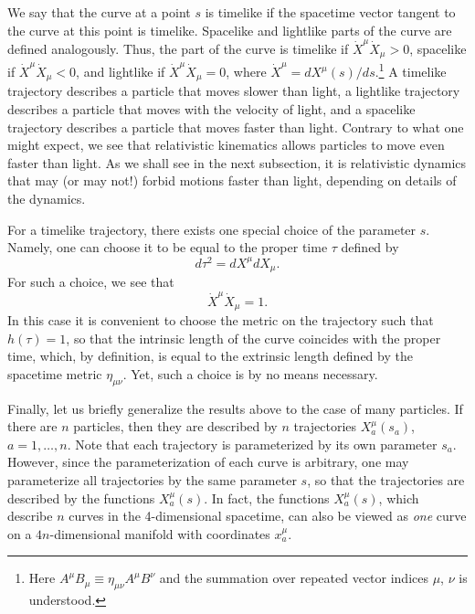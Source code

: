 \documentclass[12pt,twoside]{report} %
\begin{document}
We say that the curve at a point $s$ is timelike if the spacetime vector tangent to the curve at this
point is timelike. Spacelike and lightlike parts of the curve are defined analogously.
Thus, the part of the curve is timelike if $\dot{X}^{\mu} \dot{X}_{\mu}>0$,
spacelike if $\dot{X}^{\mu} \dot{X}_{\mu}<0$, and lightlike if $\dot{X}^{\mu} \dot{X}_{\mu}=0$, where $\dot{X}^{\mu}=dX^{\mu}(s)/ds$.\footnote{Here $A^{\mu} B_{\mu}\equiv \eta_{\mu\nu}A^{\mu} B^{\nu}$ and the summation
over repeated vector indices $\mu$, $\nu$ is understood.}
A timelike trajectory describes a particle that moves slower than light, a lightlike trajectory
describes a particle that moves with the velocity of light, and a spacelike
trajectory describes a particle that moves faster than light.
Contrary to what one might expect, we see that relativistic kinematics allows
particles to move even faster than light. As we shall see in the next subsection,
it is relativistic dynamics that may (or may not!) forbid motions faster than light,
depending on details of the dynamics.

For a timelike trajectory, there exists one special choice of the parameter $s$.
Namely, one can choose it to be equal to the proper time $\tau$ defined by
\begin{equation}\label{nikolic:book4}
 d\tau^2=dX^{\mu}dX_{\mu} .
\end{equation}
For such a choice, we see that
\begin{equation}\label{nikolic:book5}
\dot{X}^{\mu} \dot{X}_{\mu}=1 .
\end{equation}
In this case it is convenient to choose the metric on the trajectory such that
$h(\tau)=1$, so that the intrinsic length of the curve coincides with the
proper time, which, by definition, is equal to the extrinsic length defined by the
spacetime metric $\eta_{\mu\nu}$. Yet, such a choice is by no means
necessary.

Finally, let us briefly generalize the results above to the case of many particles.
If there are $n$ particles, then they are described by $n$ trajectories
$X_a^{\mu}(s_a)$, $a=1,\ldots,n$. Note that each trajectory is parameterized by its own
parameter $s_a$. However, since the parameterization of each curve is arbitrary,
one may parameterize all trajectories by the same parameter $s$, so that
the trajectories are described by the functions $X_a^{\mu}(s)$. 
In fact, the functions $X_a^{\mu}(s)$, which describe $n$ curves in the
4-dimensional spacetime, can also be viewed as {\em one} curve on a $4n$-dimensional
manifold with coordinates $x_a^{\mu}$. 
\end{document}

